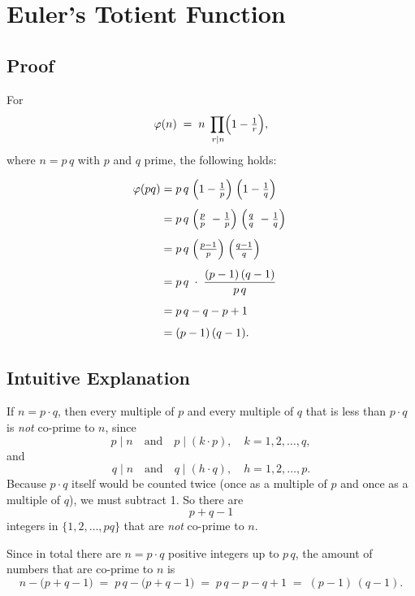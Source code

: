 \documentclass{article}
\begin{document}
\section{Euler’s Totient Function}
\subsection{Proof}
For 
\[
\varphi(n) \;=\; n \;\prod_{\,r \mid n}\Bigl(1 - \tfrac{1}{r}\Bigr),
\]
where \(n = p\,q\) with \(p\) and \(q\) prime, the following holds:

\begin{align*}
\varphi(pq)
&= p\,q \;\Bigl(1 - \tfrac{1}{p}\Bigr)\;\Bigl(1 - \tfrac{1}{q}\Bigr) \\[1ex]
&= p\,q \;\Bigl(\tfrac{p}{p}\;-\tfrac{1}{p}\Bigr)\;\Bigl(\tfrac{q}{q}\;-\tfrac{1}{q}\Bigr)\; \\[1ex]
&= p\,q \;\Bigl(\tfrac{p-1}{p}\Bigr)\;\Bigl(\tfrac{q-1}{q}\Bigr) \\[1ex]
&= p\,q \;\cdot\; \frac{(p-1)\,(q-1)}{p\,q} \\[1ex]
&= p\,q - q - p + 1 \\[1ex]
&= (p - 1)\,(q - 1).
\end{align*}


\subsection{Intuitive Explanation}

If \(n = p \cdot q\), then every multiple of \(p\) and every multiple of \(q\) that is less than \(p \cdot q\) is \emph{not} co-prime to \(n\), since
\[
p \mid n \quad\text{and}\quad p \mid (k \cdot p),\quad k = 1,2,\dots,q,
\]
and
\[
q \mid n \quad\text{and}\quad q \mid (h \cdot q),\quad h = 1,2,\dots,p.
\]
Because \(p \cdot q\) itself would be counted twice (once as a multiple of \(p\) and once as a multiple of \(q\)), we must subtract 1.  So there are
\[
p + q - 1
\]
integers in \(\{1,2,\dots,pq\}\) that are \emph{not} co-prime to \(n\).

Since in total there are \(n = p \cdot q\) positive integers up to \(p\,q\), the amount of numbers that are co-prime to \(n\) is
\[
n - \bigl(p + q - 1\bigr)
\;=\; p\,q - \bigl(p + q - 1\bigr)
\;=\; p\,q - p - q + 1
\;=\; (p-1)\,(q-1).
\]
\end{document}
